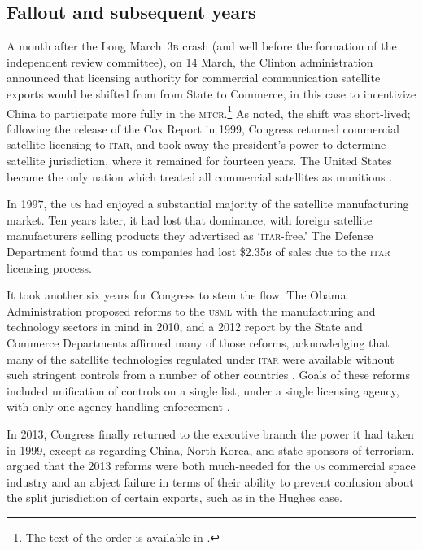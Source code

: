 \documentclass[preprint,twocolumn,5p]{elsarticle}
\begin{document}
\subsection{Fallout and subsequent years}
A month after the Long March~\textsc{3b} crash (and well before the formation of the independent review committee), on 14 March, the Clinton administration announced that licensing authority for commercial communication satellite exports would be shifted from from State to Commerce, in this case to incentivize China to participate more fully in the \textsc{mtcr}.\footnote{The text of the order is available in \citet{State61FR56894_1996}.} As \citet{Zinger2015} noted, the shift was short-lived; following the release of the Cox Report in 1999, Congress returned commercial satellite licensing to \textsc{itar}, and took away the president's power to determine satellite jurisdiction, where it remained for fourteen years. The United States became the only nation which treated all commercial satellites as munitions \citep{Section1248}.

In 1997, the \textsc{us} had enjoyed a substantial majority of the satellite manufacturing market. Ten years later, it had lost that dominance, with foreign satellite manufacturers selling products they advertised as `\textsc{itar}-free.' The Defense Department found that \textsc{us} companies had lost \$2.35\textsc{b} of sales due to the \textsc{itar} licensing process. \citep{AFRL2007}

It took another six years for Congress to stem the flow. The Obama Administration proposed reforms to the \textsc{usml} with the manufacturing and technology sectors in mind in 2010, and a 2012 report by the State and Commerce Departments affirmed many of those reforms, acknowledging that many of the satellite technologies regulated under \textsc{itar} were available without such stringent controls from a number of other countries \citep{Section1248}. Goals of these reforms included unification of controls on a single list, under a single licensing agency, with only one agency handling enforcement \citep{Fergusson2020}.

In 2013, Congress finally returned to the executive branch the power it had taken in 1999, except as regarding China, North Korea, and state sponsors of terrorism. \citet{Zinger2015} argued that the 2013 reforms were both much-needed for the \textsc{us} commercial space industry and an abject failure in terms of their ability to prevent confusion about the split jurisdiction of certain exports, such as in the Hughes case.
\end{document}
